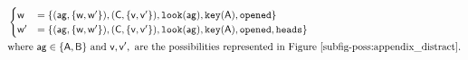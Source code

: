 $\begin{aligned}
  &\begin{cases}
    \poss{w}&= \bra{
      (\agent{ag},\bra{\poss{w}, \poss{w^\prime}}),
      (\agent{c},\bra{\poss{v}, \poss{v^\prime}}),
      \looking{ag},
      \haskey{a},
      \opened}\\
    \poss{w^\prime} &=\bra{
      (\agent{ag},\bra{\poss{w}, \poss{w^\prime}}),
      (\agent{c},\bra{\poss{v}, \poss{v^\prime}}),
      \looking{ag}, \haskey{a}, \opened, \head}
   \end{cases}\\
  &\text{where } \agent{ag} \in \bra{\agent{a},\agent{b}}\text{ and } \poss{v},
            \poss{v^\prime}, \text{ are the \posS\ represented in Figure~\ref{subfig-poss:appendix_distract}}.
\end{aligned}$
